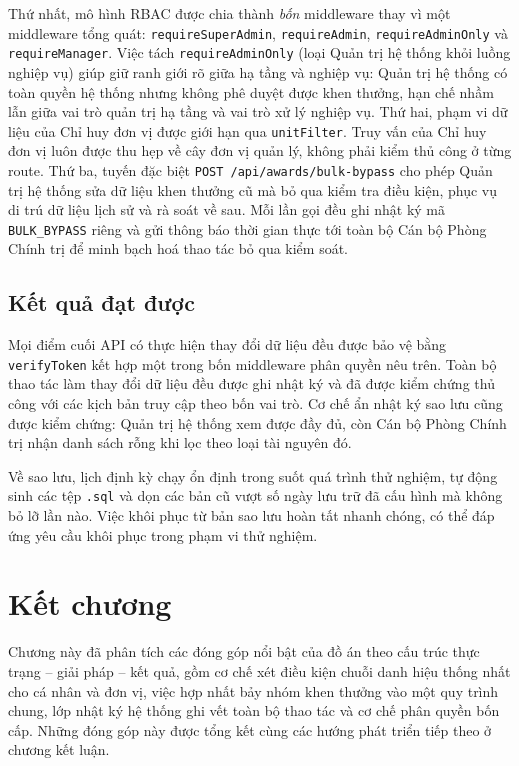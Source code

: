 \documentclass[../DoAn.tex]{subfiles}
\begin{document}
Thứ nhất, mô hình RBAC \cite{sandhu1996rbac} được chia thành \emph{bốn} middleware thay vì một middleware tổng quát: \texttt{requireSuperAdmin}, \texttt{requireAdmin}, \texttt{requireAdminOnly} và \texttt{requireManager}. Việc tách \texttt{requireAdminOnly} (loại Quản trị hệ thống khỏi luồng nghiệp vụ) giúp giữ ranh giới rõ giữa hạ tầng và nghiệp vụ: Quản trị hệ thống có toàn quyền hệ thống nhưng không phê duyệt được khen thưởng, hạn chế nhầm lẫn giữa vai trò quản trị hạ tầng và vai trò xử lý nghiệp vụ. Thứ hai, phạm vi dữ liệu của Chỉ huy đơn vị được giới hạn qua \texttt{unitFilter}. Truy vấn của Chỉ huy đơn vị luôn được thu hẹp về cây đơn vị quản lý, không phải kiểm thủ công ở từng route. Thứ ba, tuyến đặc biệt \texttt{POST /api/awards/bulk-bypass} cho phép Quản trị hệ thống sửa dữ liệu khen thưởng cũ mà bỏ qua kiểm tra điều kiện, phục vụ di trú dữ liệu lịch sử và rà soát về sau. Mỗi lần gọi đều ghi nhật ký mã \texttt{BULK\_BYPASS} riêng và gửi thông báo thời gian thực tới toàn bộ Cán bộ Phòng Chính trị để minh bạch hoá thao tác bỏ qua kiểm soát.

\subsection*{Kết quả đạt được}
Mọi điểm cuối API có thực hiện thay đổi dữ liệu đều được bảo vệ bằng \texttt{verifyToken} kết hợp một trong bốn middleware phân quyền nêu trên. Toàn bộ thao tác làm thay đổi dữ liệu đều được ghi nhật ký và đã được kiểm chứng thủ công với các kịch bản truy cập theo bốn vai trò. Cơ chế ẩn nhật ký sao lưu cũng được kiểm chứng: Quản trị hệ thống xem được đầy đủ, còn Cán bộ Phòng Chính trị nhận danh sách rỗng khi lọc theo loại tài nguyên đó.

Về sao lưu, lịch định kỳ chạy ổn định trong suốt quá trình thử nghiệm, tự động sinh các tệp \texttt{.sql} và dọn các bản cũ vượt số ngày lưu trữ đã cấu hình mà không bỏ lỡ lần nào. Việc khôi phục từ bản sao lưu hoàn tất nhanh chóng, có thể đáp ứng yêu cầu khôi phục trong phạm vi thử nghiệm.

\section*{Kết chương}

Chương này đã phân tích các đóng góp nổi bật của đồ án theo cấu trúc thực trạng -- giải pháp -- kết quả, gồm cơ chế xét điều kiện chuỗi danh hiệu thống nhất cho cá nhân và đơn vị, việc hợp nhất bảy nhóm khen thưởng vào một quy trình chung, lớp nhật ký hệ thống ghi vết toàn bộ thao tác và cơ chế phân quyền bốn cấp. Những đóng góp này được tổng kết cùng các hướng phát triển tiếp theo ở chương kết luận.
\end{document}
